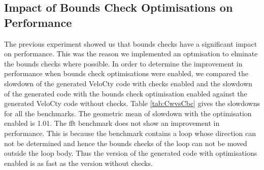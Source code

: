 \subsection{Impact of Bounds Check Optimisations on Performance}
The previous experiment showed us that bounds checks have a significant impact on performance. This was the reason we implemented an optmisation to elminate the bounds checks where possible. In order to determine the improvement in performance when bounds check optimisations were enabled, we compared the slowdown of the generated VeloCty code with checks enabled  and the slowdown of the generated code with the bounds check optimisation enabled against the generated VeloCty code without checks. Table \ref{tab:CwvsCbc} gives the slowdowns for all the benchmarks. The geometric mean of slowdown with the optimisation enabled is 1.01. The \textsf{fft} benchmark does not show an improvement in performance. This is because the benchmark contains a loop whose direction can not be determined and hence the bounds checks of the loop can not be moved outside the loop body. Thus the version of the generated code with optimisations enabled is as fast as the version without checks. 
